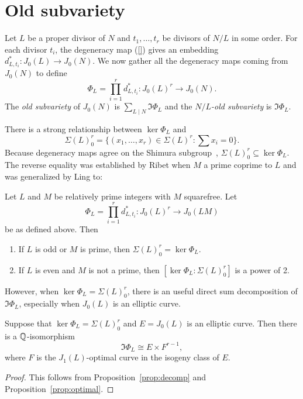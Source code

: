\documentclass[11pt, proquest]{uwthesis}
\begin{document}
\section{Old subvariety}%
\label{sec:old_subvariety}

Let $L$ be a proper divisor of $N$ and $t_1,\ldots,t_r$ be divisors of $N/L$ in
some order. For each divisor $t_i$, the degeneracy map (\ref{}) gives an
embedding $d_{L, t_i} ^*:J_0(L)\to J_0(N)$. We now gather all the degeneracy
maps coming from $J_0(N)$ to define
\[
    \Phi_L = \prod_{i=1} ^r d_{L,t_i} ^* : J_0(L)^r \to J_0(N).
\]
The \emph{old subvariety} of $J_0(N)$ is $\sum_{L\mid N} \Im\Phi_L$ and the
\emph{$N/L$-old subvariety} is $\Im\Phi_L$.

There is a strong relationship between $\ker \Phi_L$ and 
\[
    \Sigma(L)_0 ^r =\{(x_1,\ldots,x_r)\in \Sigma(L)^r: \sum x_i = 0\}.
\]
Because degeneracy maps agree on the Shimura subgroup~\cite[Theorem
4]{ling-oesterle:shimura}, $\Sigma(L)_0 ^r \subseteq \ker\Phi_L$. The reverse
equality was established by Ribet when $M$ a prime coprime to $L$ and was
generalized by Ling to:
\begin{theorem}
    \label{thm:ribet-ling}
    Let $L$ and $M$ be relatively prime integers with $M$ squarefree. Let
    \[
        \Phi_L = \prod_{i=1} ^r d_{L,t_i} ^* : J_0(L)^r \to J_0(LM)
    \]
    be as defined above. Then
    \begin{enumerate}
        \item 
            If $L$ is odd or $M$ is prime, then $\Sigma(L)_0 ^r=\ker\Phi_L$.
        \item
            If $L$ is even and $M$ is not a prime, then $[\ker\Phi_L:
            \Sigma(L)_0 ^r]$ is a power of 2.
    \end{enumerate}
\end{theorem}

However, when $\ker\Phi_L = \Sigma(L)_0 ^r$, there is an useful direct sum
decomposition of $\Im\Phi_L$, especially when $J_0(L)$ is an elliptic curve.

\begin{corollary}
    \label{cor:elliptic_decomp}
    Suppose that $\ker\Phi_L = \Sigma(L)_0 ^r$ and $E=J_0(L)$ is an elliptic
    curve. Then there is a $\mathbb{Q}$-isomorphism
    \[
        \Im\Phi_L \cong E \times F^{r-1},
    \]
    where $F$ is the $J_1(L)$-optimal curve in the isogeny class of $E$.
\end{corollary}
\begin{proof}
    This follows from Proposition~\ref{prop:decomp} and
    Proposition~\ref{prop:optimal}.
\end{proof}
\end{document}
